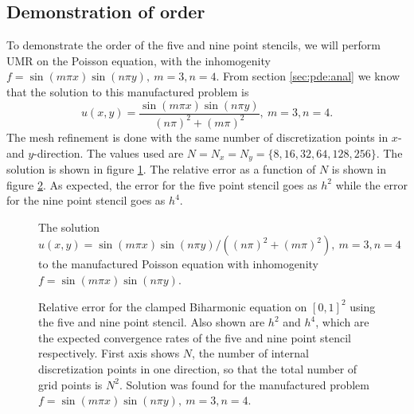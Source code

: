 \subsection{Demonstration of order}
To demonstrate the order of the five and nine point stencils, we will perform UMR on the Poisson equation, with the inhomogenity $f = \sin(m \pi x)\sin(n \pi y), ~m=3, n=4$.
From section \ref{sec:pde:anal} we know that the solution to this manufactured problem is
$$
u(x, y) =
\frac{
  \sin(m \pi x)\sin(n \pi y)
}{
  (n\pi)^2 + (m\pi)^2
}
, ~m=3, n=4.
$$
The mesh refinement is done with the same number of discretization points in $x$- and $y$-direction.
The values used are $N = N_x = N_y = \{8, 16, 32, 64, 128, 256\}$.
The solution is shown in figure \ref{fig:pde:order_solution}.
The relative error as a function of $N$ is shown in figure \ref{fig:pde:order}.
As expected, the error for the five point stencil goes as $h^2$ while the error for the nine point stencil goes as $h^4$.


\begin{figure}[tb]
  \centering
  \caption{The solution $u(x, y) = \sin(m \pi x)\sin(n \pi y) / ((n\pi)^2 + (m\pi)^2), ~m=3, n=4$ to the manufactured Poisson equation with inhomogenity $f=\sin(m \pi x)\sin(n \pi y)$.}
  \label{fig:pde:order_solution}
\end{figure}

\begin{figure}[tb]
  \centering 
  \caption{Relative error for the clamped Biharmonic equation on $[0,1]^2$ using the five and nine point stencil.
    Also shown are $h^2$ and $h^4$, which are the expected convergence rates of the five and nine point stencil respectively.
    First axis shows $N$, the number of internal discretization points in one direction, so that the total number of grid points is $N^2$.
    Solution was found for the manufactured problem $f=\sin(m \pi x)\sin(n\pi y), ~m = 3, n=4$.
  }
  \label{fig:pde:order}
\end{figure}



